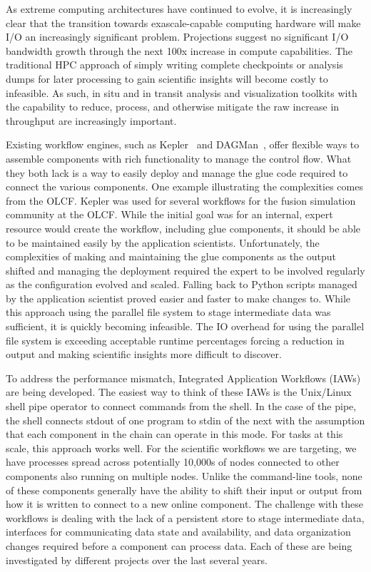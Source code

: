 \documentclass[conference]{IEEEtran}
\begin{document}
As extreme computing architectures have continued to evolve, it is increasingly
clear that the transition towards exascale-capable computing hardware will make
I/O an increasingly significant problem.  Projections suggest no significant
I/O bandwidth growth through the next 100x increase in compute capabilities.
The traditional HPC approach of simply writing complete checkpoints or analysis
dumps for later processing to gain scientific insights will become costly to
infeasible.  As such, in situ and in transit analysis and visualization
toolkits with the capability to reduce, process, and otherwise mitigate the raw
increase in throughput are increasingly important.

Existing workflow engines, such as Kepler~\cite{bertram:2006:kepler} and
DAGMan~\cite{Malewicz:2006:dagman}, offer flexible ways to assemble components
with rich functionality to manage the control flow. What they both lack is a
way to easily deploy and manage the glue code required to connect the various
components. One example illustrating the complexities comes from the OLCF.
Kepler was used for several workflows for the fusion simulation community at
the OLCF.  While the initial goal was for an internal, expert resource would
create the workflow, including glue components, it should be able to be
maintained easily by the application scientists. Unfortunately, the
complexities of making and maintaining the glue components as the output
shifted and managing the deployment required the expert to be involved
regularly as the configuration evolved and scaled.  Falling back to Python
scripts managed by the application scientist proved easier and faster to make
changes to. While this approach using the parallel file system to stage
intermediate data was sufficient, it is quickly becoming infeasible. The IO
overhead for using the parallel file system is exceeding acceptable runtime
percentages forcing a reduction in output and making scientific insights more
difficult to discover.

To address the performance mismatch, Integrated Application Workflows (IAWs)
are being developed. The easiest way to think of these IAWs is the Unix/Linux
shell pipe operator to connect commands from the shell. In the case of the
pipe, the shell connects stdout of one program to stdin of the next with the
assumption that each component in the chain can operate in this mode. For tasks
at this scale, this approach works well. For the scientific workflows we are
targeting, we have processes spread across potentially 10,000s of nodes
connected to other components also running on multiple nodes. Unlike the
command-line tools, none of these components generally have the ability to
shift their input or output from how it is written to connect to a new online
component. The challenge with these workflows is dealing with the lack of a
persistent store to stage intermediate data, interfaces for communicating data
state and availability, and data organization changes required before a
component can process data.  Each of these are being investigated by different
projects over the last several years.
\end{document}
